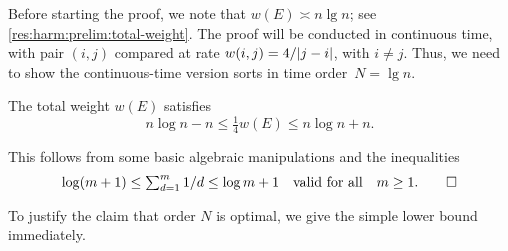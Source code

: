 \documentclass{article}
\begin{document}
Before starting the proof, we note that $w(E) \asymp n \lg n$; see \cref{res:harm:prelim:total-weight}.
The proof will be conducted in continuous time, with pair $(i,j)$ compared at rate $w(i,j) = 4/| j-i |$, with $i \ne j$.
Thus, we need to show the continuous-time version sorts in time order~$N = \lg n$.


\begin{lem}
\label{res:harm:prelim:total-weight}
The total weight $w(E)$ satisfies
\[
	n \log n
-	n
\le
	\tfrac14 w(E)
\le
	n \log n
+	n.
\]
\end{lem}

\begin{Proof}%
This follows from some basic algebraic manipulations and the inequalities
\[
	\log(m + 1)
\le
	\sumt{d=1}[m]
	1/d
\le
	\log m + 1
\Quad{valid for all}
	m \ge 1.
\qedhere
\]
\end{Proof}

%	

To justify the claim that order $N$ is optimal, we give the simple lower bound immediately.
\end{document}
